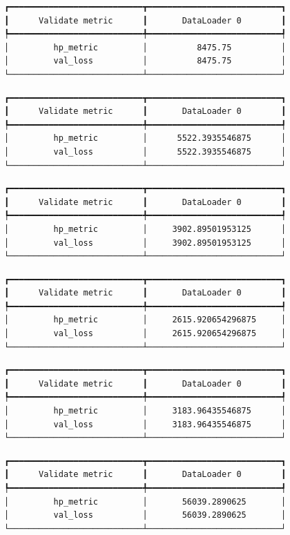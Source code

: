 \documentclass[
  letterpaper,
  DIV=11,
  numbers=noendperiod]{scrreprt}
\begin{document}
\begin{verbatim}
┏━━━━━━━━━━━━━━━━━━━━━━━━━━━┳━━━━━━━━━━━━━━━━━━━━━━━━━━━┓
┃      Validate metric      ┃       DataLoader 0        ┃
┡━━━━━━━━━━━━━━━━━━━━━━━━━━━╇━━━━━━━━━━━━━━━━━━━━━━━━━━━┩
│         hp_metric         │          8475.75          │
│         val_loss          │          8475.75          │
└───────────────────────────┴───────────────────────────┘
\end{verbatim}

\begin{verbatim}
┏━━━━━━━━━━━━━━━━━━━━━━━━━━━┳━━━━━━━━━━━━━━━━━━━━━━━━━━━┓
┃      Validate metric      ┃       DataLoader 0        ┃
┡━━━━━━━━━━━━━━━━━━━━━━━━━━━╇━━━━━━━━━━━━━━━━━━━━━━━━━━━┩
│         hp_metric         │      5522.3935546875      │
│         val_loss          │      5522.3935546875      │
└───────────────────────────┴───────────────────────────┘
\end{verbatim}

\begin{verbatim}
┏━━━━━━━━━━━━━━━━━━━━━━━━━━━┳━━━━━━━━━━━━━━━━━━━━━━━━━━━┓
┃      Validate metric      ┃       DataLoader 0        ┃
┡━━━━━━━━━━━━━━━━━━━━━━━━━━━╇━━━━━━━━━━━━━━━━━━━━━━━━━━━┩
│         hp_metric         │     3902.89501953125      │
│         val_loss          │     3902.89501953125      │
└───────────────────────────┴───────────────────────────┘
\end{verbatim}

\begin{verbatim}
┏━━━━━━━━━━━━━━━━━━━━━━━━━━━┳━━━━━━━━━━━━━━━━━━━━━━━━━━━┓
┃      Validate metric      ┃       DataLoader 0        ┃
┡━━━━━━━━━━━━━━━━━━━━━━━━━━━╇━━━━━━━━━━━━━━━━━━━━━━━━━━━┩
│         hp_metric         │     2615.920654296875     │
│         val_loss          │     2615.920654296875     │
└───────────────────────────┴───────────────────────────┘
\end{verbatim}

\begin{verbatim}
┏━━━━━━━━━━━━━━━━━━━━━━━━━━━┳━━━━━━━━━━━━━━━━━━━━━━━━━━━┓
┃      Validate metric      ┃       DataLoader 0        ┃
┡━━━━━━━━━━━━━━━━━━━━━━━━━━━╇━━━━━━━━━━━━━━━━━━━━━━━━━━━┩
│         hp_metric         │     3183.96435546875      │
│         val_loss          │     3183.96435546875      │
└───────────────────────────┴───────────────────────────┘
\end{verbatim}

\begin{verbatim}
┏━━━━━━━━━━━━━━━━━━━━━━━━━━━┳━━━━━━━━━━━━━━━━━━━━━━━━━━━┓
┃      Validate metric      ┃       DataLoader 0        ┃
┡━━━━━━━━━━━━━━━━━━━━━━━━━━━╇━━━━━━━━━━━━━━━━━━━━━━━━━━━┩
│         hp_metric         │       56039.2890625       │
│         val_loss          │       56039.2890625       │
└───────────────────────────┴───────────────────────────┘
\end{verbatim}
\end{document}
